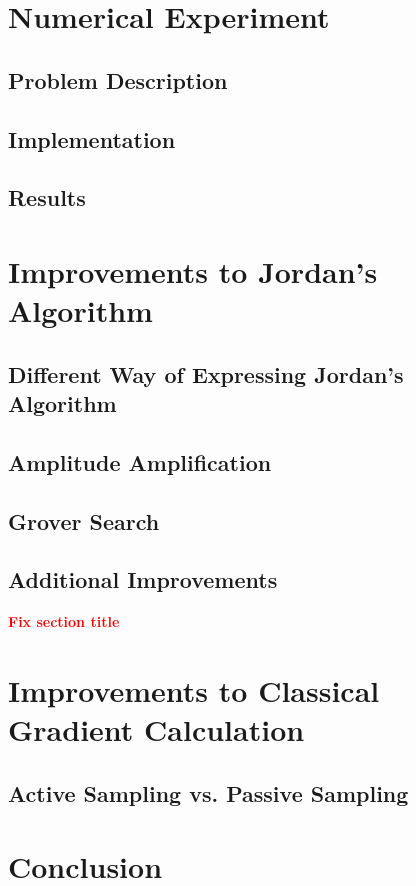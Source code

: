\documentclass{article}
\begin{document}
\section{Numerical Experiment}
\subsection{Problem Description}
\subsection{Implementation}
\subsection{Results}

\section{Improvements to Jordan's Algorithm}
\subsection{Different Way of Expressing Jordan's Algorithm}
\subsection{Amplitude Amplification}
\subsection{Grover Search}
\subsection{Additional Improvements}
\textbf{\textcolor{red}{Fix section title}}

\section{Improvements to Classical Gradient Calculation}
\subsection{Active Sampling vs. Passive Sampling}

\section{Conclusion}
\printbibliography
\end{document}
